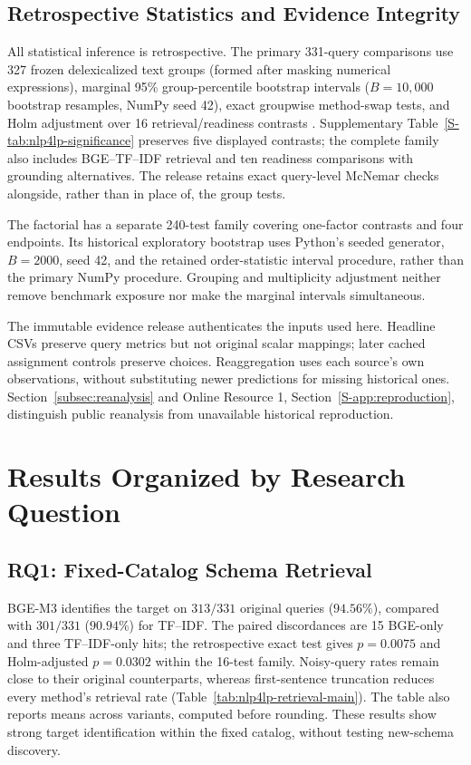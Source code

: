 \documentclass[pdflatex,iicol,sn-basic,Numbered]{sn-jnl}
\begin{document}
\subsection{Retrospective Statistics and Evidence Integrity}
\label{subsec:exp_significance}
All statistical inference is retrospective. The primary 331-query comparisons use 327 frozen delexicalized text groups (formed after masking numerical expressions), marginal 95\% group-percentile bootstrap intervals ($B=10{,}000$ bootstrap resamples, NumPy seed 42), exact groupwise method-swap tests, and Holm adjustment over 16 retrieval/readiness contrasts \cite{holm1979followup}. Supplementary Table~\ref{S-tab:nlp4lp-significance} preserves five displayed contrasts; the complete family also includes BGE--TF--IDF retrieval and ten readiness comparisons with grounding alternatives. The release retains exact query-level McNemar checks alongside, rather than in place of, the group tests.

The factorial has a separate 240-test family covering one-factor contrasts and four endpoints. Its historical exploratory bootstrap uses Python's seeded generator, $B=2000$, seed 42, and the retained order-statistic interval procedure, rather than the primary NumPy procedure. Grouping and multiplicity adjustment neither remove benchmark exposure nor make the marginal intervals simultaneous.

The immutable evidence release authenticates the inputs used here. Headline CSVs preserve query metrics but not original scalar mappings; later cached assignment controls preserve choices. Reaggregation uses each source's own observations, without substituting newer predictions for missing historical ones. Section~\ref{subsec:reanalysis} and Online Resource 1, Section~\ref{S-app:reproduction}, distinguish public reanalysis from unavailable historical reproduction.

\section{Results Organized by Research Question}
\label{sec:experiments}
\subsection{RQ1: Fixed-Catalog Schema Retrieval}
\label{subsec:exp_retrieval}
BGE-M3 identifies the target on $313/331$ original queries ($94.56\%$), compared with $301/331$ ($90.94\%$) for TF--IDF. The paired discordances are 15 BGE-only and three TF--IDF-only hits; the retrospective exact test gives $p=0.0075$ and Holm-adjusted $p=0.0302$ within the 16-test family. Noisy-query rates remain close to their original counterparts, whereas first-sentence truncation reduces every method's retrieval rate (Table~\ref{tab:nlp4lp-retrieval-main}). The table also reports means across variants, computed before rounding. These results show strong target identification within the fixed catalog, without testing new-schema discovery.
\end{document}
